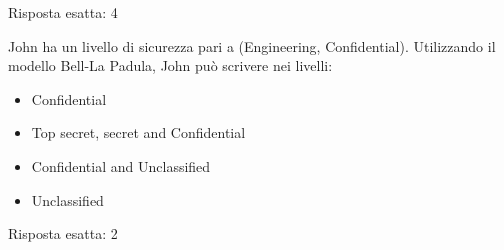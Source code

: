\begin{Answer} [
  ref={pass3},
  number={3}
  ]

  \Question Risposta esatta: 4

\end{Answer}


\begin{Exercise} [
  title={Domanda},
  label={pass4}
 ]

 \Question John ha un livello di sicurezza pari a (Engineering, Confidential).
Utilizzando il modello Bell-La Padula, John può scrivere nei livelli:
\begin{itemize}
\item Confidential
\item Top secret, secret and Confidential
\item Confidential and Unclassified
\item Unclassified
\end{itemize}


\end{Exercise}

\begin{Answer} [
  ref={pass4},
  number={4}
  ]

  \Question Risposta esatta: 2

\end{Answer}


